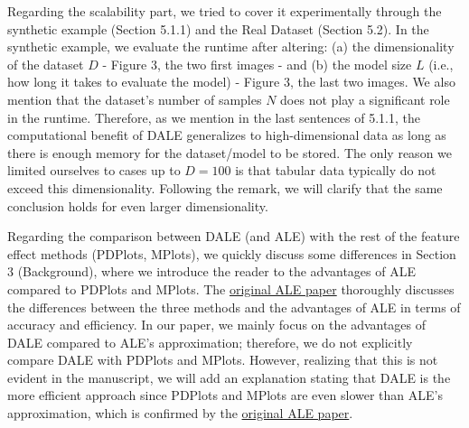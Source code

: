 \documentclass{article}
\begin{document}
Regarding the scalability part, we tried to cover it experimentally through the synthetic example (Section 5.1.1) and the Real Dataset (Section 5.2). In the synthetic example, we evaluate the runtime after altering: (a) the dimensionality of the dataset \(D\) - Figure 3, the two first images - and (b) the model size \(L\) (i.e., how long it takes to evaluate the model) - Figure 3, the last two images. We also mention that the dataset's number of samples \(N\) does not play a significant role in the runtime. Therefore, as we mention in the last sentences of 5.1.1, the computational benefit of DALE generalizes to high-dimensional data as long as there is enough memory for the dataset/model to be stored. The only reason we limited ourselves to cases up to \(D=100\) is that tabular data typically do not exceed this dimensionality. Following the remark, we will clarify that the same conclusion holds for even larger dimensionality.

Regarding the comparison between DALE (and ALE) with the rest of the feature effect methods (PDPlots, MPlots), we quickly discuss some differences in Section 3 (Background), where we introduce the reader to the advantages of ALE compared to PDPlots and MPlots. The \href{https://arxiv.org/pdf/1612.08468.pdf}{original ALE paper} thoroughly discusses the differences between the three methods and the advantages of ALE in terms of accuracy and efficiency. In our paper, we mainly focus on the advantages of DALE compared to ALE's approximation; therefore, we do not explicitly compare DALE with PDPlots and MPlots. However, realizing that this is not evident in the manuscript, we will add an explanation stating that DALE is the more efficient approach since PDPlots and MPlots are even slower than ALE's approximation, which is confirmed by the \href{https://arxiv.org/pdf/1612.08468.pdf}{original ALE paper}.
\end{document}
